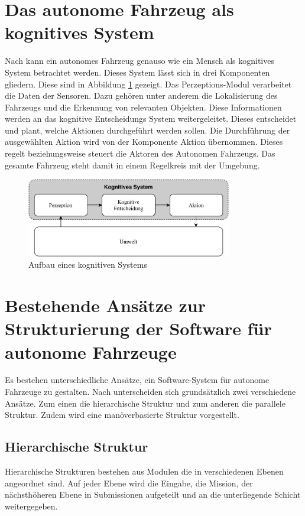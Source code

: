 \section{Das autonome Fahrzeug als kognitives System}
Nach \cite{TAS16} kann ein autonomes Fahrzeug genauso wie ein Mensch als kognitives System betrachtet werden. Dieses System lässt sich in drei Komponenten gliedern. Diese sind in Abbildung \ref{kog:sys} gezeigt. Das Perzeptions-Modul verarbeitet die Daten der Sensoren. Dazu gehören unter anderem die Lokalisierung des Fahrzeugs und die Erkennung von relevanten Objekten. Diese Informationen werden an das kognitive Entscheidungs System weitergeleitet. Dieses entscheidet und plant, welche Aktionen durchgeführt werden sollen. Die Durchführung der ausgewählten Aktion wird von der Komponente Aktion übernommen. Dieses regelt beziehungsweise steuert die Aktoren des Autonomen Fahrzeugs. Das gesamte Fahrzeug steht damit in einem Regelkreis mit der Umgebung.
\FloatBarrier
\begin{figure}[h]
  \centering
  \includegraphics[width=0.8\textwidth]{images/stand_der_technik/kognitivesSystem.pdf}
  \caption[Aufbau eines kognitiven Systems]{Aufbau eines kognitiven Systems}
  \label{kog:sys}
\end{figure}
\FloatBarrier

\section{Bestehende Ansätze zur Strukturierung der Software für autonome Fahrzeuge}
Es bestehen unterschiedliche Ansätze, ein Software-System für autonome Fahrzeuge zu gestalten. Nach \cite{JUN14} unterscheiden sich grundsätzlich zwei verschiedene Ansätze. Zum einen die hierarchische Struktur und zum anderen die parallele Struktur. Zudem wird eine manöverbasierte Struktur vorgestellt.

\subsection{Hierarchische Struktur}
Hierarchische Strukturen bestehen aus Modulen die in verschiedenen Ebenen angeordnet sind. Auf jeder Ebene wird die Eingabe, die Mission, der nächsthöheren Ebene in Submissionen aufgeteilt und an die unterliegende Schicht weitergegeben.

